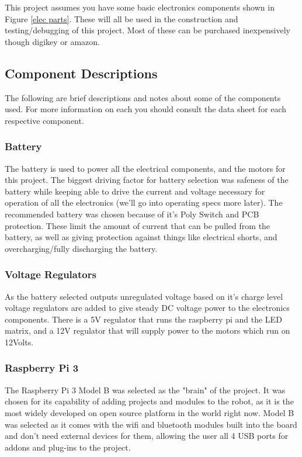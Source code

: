\documentclass[12pt]{article}
\begin{document}
This project assumes you have some basic electronics components shown in Figure \ref{elec parts}. These will all be used in the construction and testing/debugging of this project. Most of these can be purchased inexpensively though digikey or amazon. 

\subsection{Component Descriptions}
The following are brief descriptions and notes about some of the components used. For more information on each you should consult the data sheet for each respective component. 
\subsubsection{Battery}
The battery is used to power all the electrical components, and the motors for this project. The biggest driving factor for battery selection was safeness of the battery while keeping able to drive the current and voltage necessary for operation of all the electronics (we'll go into operating specs more later). The recommended battery was chosen because of it's Poly Switch and PCB protection. These limit the amount of current that can be pulled from the battery, as well as giving protection against things like electrical shorts, and overcharging/fully discharging the battery. 
\subsubsection{Voltage Regulators}
As the battery selected outputs unregulated voltage based on it's charge level voltage regulators are added to give steady DC voltage power to the electronics components. There is a 5V regulator that runs the raspberry pi and the LED matrix, and a 12V regulator that will supply power to the motors which run on 12Volts. 
\subsubsection{Raspberry Pi 3}
The Raspberry Pi 3 Model B was selected as the "brain" of the project. It was chosen for its capability of adding projects and modules to the robot, as it is the most widely developed on open source platform in the world right now. Model B was selected as it comes with the wifi and bluetooth modules built into the board and don't need external devices for them, allowing the user all 4 USB ports for addons and plug-ins to the project.  
\end{document}
